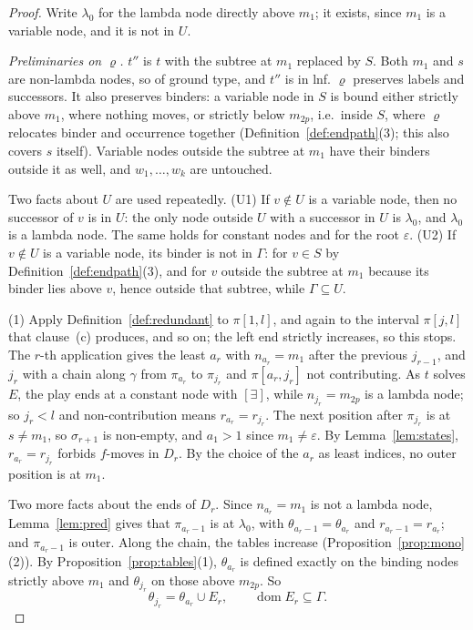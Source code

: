 \documentclass[11pt]{article}
\newcommand{\iv}[2]{\pi[#1,#2]}
\theoremstyle{plain}
\theoremstyle{definition}
\theoremstyle{remark}
\begin{document}
\begin{proof}
Write $\lambda_0$ for the lambda node directly above $m_1$; it exists,
since $m_1$ is a variable node, and it is not in $U$.

\emph{Preliminaries on $\varrho$.}  $t''$ is $t$ with the subtree at
$m_1$ replaced by $S$.  Both $m_1$ and $s$ are non-lambda nodes, so of
ground type, and $t''$ is in lnf.  $\varrho$ preserves labels and
successors.  It also preserves binders: a variable node in $S$ is bound
either strictly above $m_1$, where nothing moves, or strictly below
$m_{2p}$, i.e.\ inside $S$, where $\varrho$ relocates binder and
occurrence together (Definition~\ref{def:endpath}(3); this also covers
$s$ itself).  Variable nodes outside the subtree at $m_1$ have their
binders outside it as well, and $w_1,\dots,w_k$ are untouched.

Two facts about $U$ are used repeatedly.  (U1) If $v\notin U$ is a
variable node, then no successor of $v$ is in $U$: the only node outside
$U$ with a successor in $U$ is $\lambda_0$, and $\lambda_0$ is a lambda
node.  The same holds for constant nodes and for the root $\varepsilon$.
(U2) If $v\notin U$ is a variable node, its binder is not in $\Gamma$:
for $v\in S$ by Definition~\ref{def:endpath}(3), and for $v$ outside the
subtree at $m_1$ because its binder lies above $v$, hence outside that
subtree, while $\Gamma\subseteq U$.

(1) Apply Definition~\ref{def:redundant} to $\iv1l$, and again to the
interval $\iv{j}{l}$ that clause~(c) produces, and so on; the left end
strictly increases, so this stops.  The $r$-th application gives the
least $a_r$ with $n_{a_r}=m_1$ after the previous $j_{r-1}$, and $j_r$
with a chain along $\gamma$ from $\pi_{a_r}$ to $\pi_{j_r}$ and
$\iv{a_r}{j_r}$ not contributing.  As $t$ solves $E$, the play ends at a
constant node with $[\exists]$, while $n_{j_r}=m_{2p}$ is a lambda node;
so $j_r<l$ and non-contribution means $r_{a_r}=r_{j_r}$.  The next
position after $\pi_{j_r}$ is at $s\ne m_1$, so $\sigma_{r+1}$ is
non-empty, and $a_1>1$ since $m_1\ne\varepsilon$.  By
Lemma~\ref{lem:states}, $r_{a_r}=r_{j_r}$ forbids $f$-moves in
$D_r$.  By the choice of the $a_r$ as least indices, no outer position
is at $m_1$.

Two more facts about the ends of $D_r$.  Since $n_{a_r}=m_1$ is not a
lambda node, Lemma~\ref{lem:pred} gives that $\pi_{a_r-1}$ is at
$\lambda_0$, with $\theta_{a_r-1}=\theta_{a_r}$ and
$r_{a_r-1}=r_{a_r}$; and $\pi_{a_r-1}$ is outer.  Along the chain, the
tables increase (Proposition~\ref{prop:mono}(2)).  By
Proposition~\ref{prop:tables}(1), $\theta_{a_r}$ is defined exactly on
the binding nodes strictly above $m_1$ and $\theta_{j_r}$ on those
above $m_{2p}$.  So
\[
\theta_{j_r}=\theta_{a_r}\cup E_r ,\qquad
\operatorname{dom}E_r\subseteq\Gamma. \tag{$*$}
\]


\end{proof}
\end{document}

